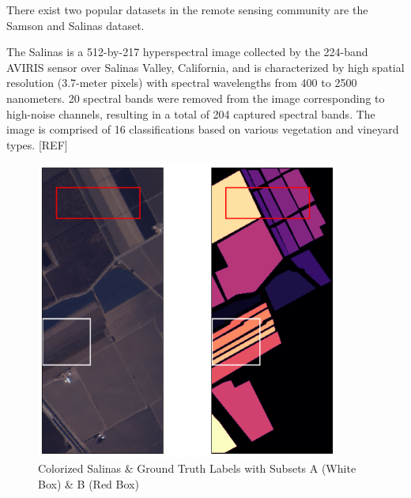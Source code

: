 There exist two popular datasets in the remote sensing community are the Samson and Salinas dataset. 

The Salinas is a 512-by-217 hyperspectral image collected by the 224-band AVIRIS sensor over Salinas Valley, California, and is characterized by high spatial resolution (3.7-meter pixels) with spectral wavelengths from 400 to 2500 nanometers. 20 spectral bands were removed from the image corresponding to high-noise channels, resulting in a total of 204 captured spectral bands. The image is comprised of 16 classifications based on various vegetation and vineyard types. [REF] 
\begin{figure}[H]
    \centering
    \includegraphics[width=10cm]{salinas_overview.png}  %
    \caption{Colorized Salinas \& Ground Truth Labels with Subsets A (White Box) \& B (Red Box)}
    \label{salinas-borders}  %
  \end{figure}

